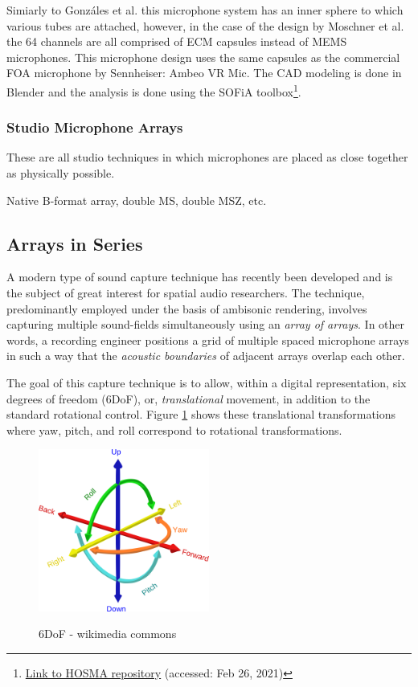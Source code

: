 Simiarly to Gonzáles et al. this microphone system has an inner sphere to which various tubes are attached, however, in the case of the design by Moschner et al. the 64 channels are all comprised of ECM capsules instead of MEMS microphones. This microphone design uses the same capsules as the commercial FOA microphone by Sennheiser: Ambeo VR Mic. The CAD modeling is done in Blender and the analysis is done using the SOFiA toolbox\footnote{\href{https://github.com/AudioGroupCologne/hosma}{Link to HOSMA repository} (accessed: Feb 26, 2021)}. 




\subsubsection{Studio Microphone Arrays}

These are all studio techniques in which microphones are placed as close together as physically possible. 

Native B-format array, double MS, double MSZ, etc.

\subsection{Arrays in Series}

A modern type of sound capture technique has recently been developed and is the subject of great interest for spatial audio researchers. The technique, predominantly employed under the basis of ambisonic rendering, involves capturing multiple sound-fields simultaneously using an \textit{array of arrays}. In other words, a recording engineer positions a grid of multiple spaced microphone arrays in such a way that the \textit{acoustic boundaries} of adjacent arrays overlap each other. 

The goal of this capture technique is to allow, within a digital representation, six degrees of freedom (6DoF), or, \textit{translational} movement, in addition to the standard rotational control. Figure \ref{fig:6DoF} shows these translational transformations where yaw, pitch, and roll correspond to rotational transformations. 

\begin{figure}[h!]%
\centering
\includegraphics[width=0.5\textwidth]{img/6DOF.svg.png} 
\label{fig:6DoF}
\caption{6DoF - wikimedia commons}
\end{figure}

